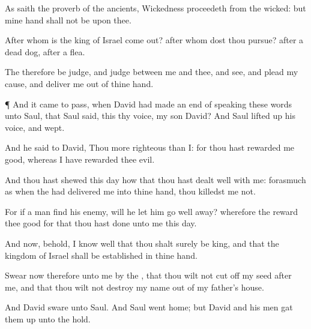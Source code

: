 {As
saith the
proverb of the
ancients,
Wickedness
proceedeth from the
wicked: but mine
hand shall not be upon thee.

After whom is the
king of
Israel come
out?
after whom dost thou
pursue?
after a
dead
dog,
after
a
flea.

The
{} therefore be
judge, and
judge between me and thee, and
see, and
plead my
cause, and
deliver me out of thine
hand.


\par }{\PP {}¶ And it came to pass, when
David had made an
end of
speaking these
words unto
Saul, that
Saul
said,
{} this thy
voice, my
son
David? And
Saul lifted
up his
voice, and
wept.

And he
said to
David, Thou
{} more
righteous than I: for thou hast
rewarded me
good, whereas I have
rewarded thee
evil.

And thou hast
shewed this
day how that thou hast
dealt
well with me: forasmuch as when the
{} had
delivered me into thine
hand, thou
killedst me not.

For if a
man
find his
enemy, will he let him
go
well
away? wherefore the
{}
reward thee
good for that thou hast
done unto me this
day.

And now, behold, I know
well that thou shalt
surely be
king, and that the
kingdom of
Israel shall be
established in thine
hand.

Swear now therefore unto me by the
{}, that thou wilt
not cut
off my
seed
after me, and that thou wilt not
destroy my
name out of my
father’s
house.

And
David
sware unto
Saul. And
Saul
went
home; but
David and his
men gat them
up unto the
hold.




\par }
